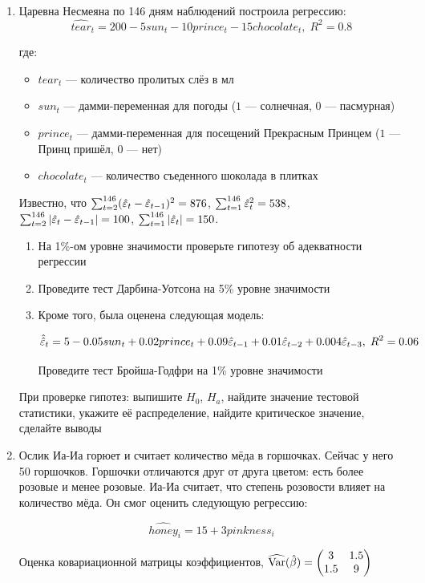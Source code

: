 \documentclass[12pt, a4paper]{article}
\begin{document}
\begin{enumerate}
\item Царевна Несмеяна по 146 дням наблюдений построила регрессию:
\[
\widehat{tear}_t = 200 - 5 sun_t - 10 prince_t - 15 chocolate_t, \; R^2 = 0.8
\]

где:
\begin{itemize}
\item $tear_t$ — количество пролитых слёз в мл
\item $sun_t$ — дамми-переменная для погоды ($1$ — солнечная, $0$ — пасмурная)
\item $prince_t$ — дамми-переменная для посещений Прекрасным Принцем ($1$ — Принц пришёл, $0$ — нет)
\item $chocolate_t$ — количество съеденного шоколада в плитках
\end{itemize}



Известно, что $\sum_{t=2}^{146} (\hat{\varepsilon}_t - \hat{\varepsilon}_{t-1})^2 = 876$, $\sum_{t=1}^{146} \hat{\varepsilon}_t^2 = 538$, $\sum_{t=2}^{146} |\hat{\varepsilon}_t - \hat{\varepsilon}_{t-1}| = 100$, $\sum_{t=1}^{146} |\hat{\varepsilon}_t| = 150$.

\begin{enumerate}
\item На 1\%-ом уровне значимости проверьте гипотезу об адекватности регрессии
\item Проведите тест Дарбина-Уотсона на 5\% уровне значимости
\item Кроме того, была оценена следующая модель:

\[
\hat{\hat{\varepsilon}}_t = 5 - 0.05 sun_t + 0.02 prince_t + 0.09 \hat{\varepsilon}_{t-1} + 0.01 \hat{\varepsilon}_{t-2} + 0.004 \hat{\varepsilon}_{t-3}, \; R^2 = 0.06
\]

Проведите тест Бройша-Годфри на 1\% уровне значимости
\end{enumerate}

При проверке гипотез: выпишите $H_0$, $H_a$, найдите значение тестовой статистики, укажите её распределение, найдите критическое значение, сделайте выводы


\item Ослик Иа-Иа горюет и считает количество мёда в горшочках. Сейчас у него 50 горшочков. Горшочки отличаются друг от друга цветом: есть более розовые и менее розовые. Иа-Иа считает, что степень розовости влияет на количество мёда. Он смог оценить следующую регрессию:

\[
\widehat{honey}_i = 15 + 3 pinkness_i
\]

Оценка ковариационной матрицы коэффициентов,
$\widehat{\operatorname{Var}}(\hat{\beta}) = \begin{pmatrix}
3 & 1.5 \\
1.5 & 9 \\
\end{pmatrix}$


\end{enumerate}
\end{document}
